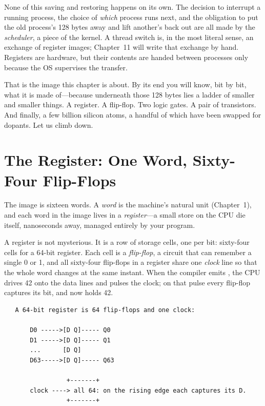 \begin{osconcept}
None of this saving and restoring happens on its own. The decision to
interrupt a running process, the choice of \emph{which} process runs
next, and the obligation to put the old process's 128 bytes away and
lift another's back out are all made by the \emph{scheduler}, a piece
of the kernel. A thread switch is, in the most literal sense, an
exchange of register images; Chapter~11 will write that exchange by
hand. Registers are hardware, but their contents are handed between
processes only because the OS supervises the transfer.
\end{osconcept}

That is the image this chapter is about. By its end you will know,
bit by bit, what it is made of---because underneath those 128 bytes
lies a ladder of smaller and smaller things. A register. A
flip-flop. Two logic gates. A pair of transistors. And finally, a few
billion silicon atoms, a handful of which have been swapped for
dopants. Let us climb down.

\section{The Register: One Word, Sixty-Four Flip-Flops}
\label{sec:register}

The image is sixteen words. A \emph{word} is the machine's natural
unit (Chapter~1), and each word in the image lives in a
\emph{register}---a small store on the CPU die itself, nanoseconds
away, managed entirely by your program.

A register is not mysterious. It is a row of storage cells, one per
bit: sixty-four cells for a 64-bit register. Each cell is a
\emph{flip-flop}, a circuit that can remember a single 0 or 1, and
all sixty-four flip-flops in a register share one \emph{clock} line
so that the whole word changes at the same instant. When the compiler
emits , the CPU drives 42 onto the data lines and
pulses the clock; on that pulse every flip-flop captures its bit, and
 now holds 42.

\begin{verbatim}
   A 64-bit register is 64 flip-flops and one clock:

       D0 ----->[D Q]----- Q0
       D1 ----->[D Q]----- Q1
       ...      [D Q]
       D63----->[D Q]----- Q63

                 +-------+
       clock ----> all 64: on the rising edge each captures its D.
                 +-------+
\end{verbatim}

